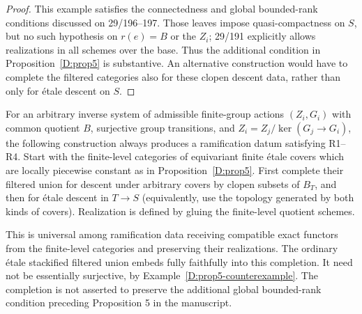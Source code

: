 \begin{proof}
This example satisfies the connectedness and global bounded-rank
conditions discussed on 29/196--197. Those leaves impose
quasi-compactness on $S$, but no such hypothesis on $r(e)=B$ or the
$Z_i$; 29/191 explicitly allows realizations in all schemes over
the base. Thus the additional condition in
Proposition~\ref{D:prop5} is substantive. An alternative construction
would have to complete the filtered categories also for these
clopen descent data, rather than only for \'etale descent on $S$.
\end{proof}


\begin{proposition}
\label{D:prop5-completion}
For an arbitrary inverse system of admissible finite-group actions
$(Z_i,G_i)$ with common quotient $B$, surjective group transitions,
and $Z_i=Z_j/\ker(G_j\to G_i)$, the following construction always
produces a ramification datum satisfying R1--R4. Start with the
finite-level categories of equivariant finite \'etale covers which
are locally piecewise constant as in Proposition~\ref{D:prop5}.
First complete their filtered union for descent under arbitrary
covers by clopen subsets of $B_T$, and then for \'etale descent
in $T\to S$ (equivalently, use the topology generated by both
kinds of covers). Realization is defined by gluing the finite-level
quotient schemes.

This is universal among ramification data receiving compatible
exact functors from the finite-level categories and preserving
their realizations. The ordinary \'etale stackified filtered union
embeds fully faithfully into this completion. It need not be
essentially surjective, by Example~\ref{D:prop5-counterexample}.
The completion is not asserted to preserve the additional global
bounded-rank condition preceding Proposition 5 in the manuscript.
\end{proposition}
